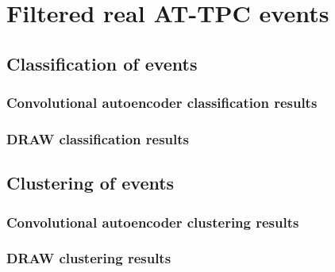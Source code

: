 \section{Filtered real AT-TPC events}

\subsection{Classification of events} 
\subsubsection{Convolutional autoencoder classification results}
\subsubsection{DRAW classification results}
\subsection{Clustering of events}
\subsubsection{Convolutional autoencoder clustering results}
\subsubsection{DRAW clustering results}
